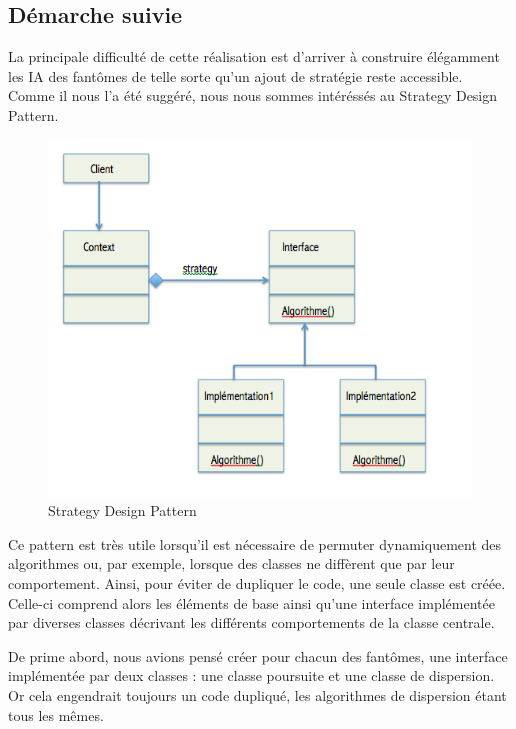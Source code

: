 \documentclass[a4paper,12pt]{report} %
\begin{document}
\subsection{Démarche suivie}
La principale difficulté de cette réalisation est d'arriver à construire élégamment les IA des fantômes de telle sorte qu'un ajout de stratégie reste accessible.
Comme il nous l'a été suggéré, nous nous sommes intéréssés au Strategy Design Pattern.

\begin{figure}[!h] %
		\centering
		\includegraphics[scale=0.7]{ressources/StrategyDesignPattern.png}
		\caption{Strategy Design Pattern}\label{figure2}
\end{figure} 



Ce pattern est très utile lorsqu'il est nécessaire de permuter dynamiquement des algorithmes ou, par exemple, lorsque des classes ne diffèrent que par leur comportement. Ainsi, pour éviter de dupliquer le code, une seule classe est créée. Celle-ci comprend alors les éléments de base ainsi qu'une interface implémentée par diverses classes décrivant les différents comportements de la classe centrale.

De prime abord, nous avions pensé créer pour chacun des fantômes, une interface implémentée par deux classes : une classe poursuite et une classe de dispersion.
Or cela engendrait toujours un code dupliqué, les algorithmes de dispersion étant tous les mêmes.
\end{document}
